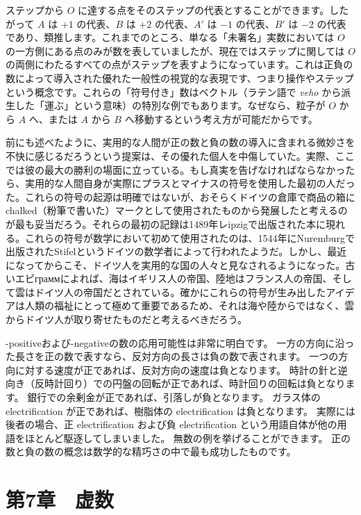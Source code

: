 \documentclass[a4paper,11pt,openany]{ltjsbook}
\providecommand{\Foreign}[1]{\textit{#1}}
\begin{document}
ステップから $O$ に達する点をそのステップの代表とすることができます。したがって $A$ は $+1$ の代表、$B$ は $+2$ の代表、$A'$ は $-1$ の代表、$B'$ は $-2$ の代表であり、類推します。これまでのところ、単なる「未署名」実数においては $O$ の一方側にある点のみが数を表していましたが、現在ではステップに関しては $O$ の両側にわたるすべての点がステップを表すようになっています。これは正負の数によって導入された優れた一般性の視覚的な表現です、つまり操作やステップという概念です。これらの「符号付き」数はベクトル（ラテン語で \Foreign{veho} から派生した「運ぶ」という意味）の特別な例でもあります。なぜなら、粒子が $O$ から $A$ へ、または $A$ から $B$ へ移動するという考え方が可能だからです。

前にも述べたように、実用的な人間が正の数と負の数の導入に含まれる微妙さを不快に感じるだろうという提案は、その優れた個人を中傷していた。実際、ここでは彼の最大の勝利の場面に立っている。もし真実を告げなければならなかったら、実用的な人間自身が実際にプラスとマイナスの符号を使用した最初の人だった。これらの符号の起源は明確ではないが、おそらくドイツの倉庫で商品の箱にchalked（粉筆で書いた）マークとして使用されたものから発展したと考えるのが最も妥当だろう。それらの最初の記録は1489年レipzigで出版された本に現れる。これらの符号が数学において初めて使用されたのは、1544年にNuremburgで出版されたStifelというドイツの数学者によって行われたようだ。しかし、最近になってからこそ、ドイツ人を実用的な国の人々と見なされるようになった。古いエピграммによれば、海はイギリス人の帝国、陸地はフランス人の帝国、そして雲はドイツ人の帝国だとされている。確かにこれらの符号が生み出したアイデアは人類の福祉にとって極めて重要であるため、それは海や陸からではなく、雲からドイツ人が取り寄せたものだと考えるべきだろう。

-positiveおよび-negativeの数の応用可能性は非常に明白です。
一方の方向に沿った長さを正の数で表すなら、反対方向の長さは負の数で表されます。
一つの方向に対する速度が正であれば、反対方向の速度は負となります。
時計の針と逆向き（反時計回り）での円盤の回転が正であれば、時計回りの回転は負となります。
銀行での余剰金が正であれば、引落しが負となります。
ガラス体の electrification が正であれば、樹脂体の electrification は負となります。
実際には後者の場合、正 electrification および負 electrification という用語自体が他の用語をほとんど駆逐してしまいました。
無数の例を挙げることができます。
正の数と負の数の概念は数学的な精巧さの中で最も成功したものです。

\chapter{第7章　虚数}
\end{document}
